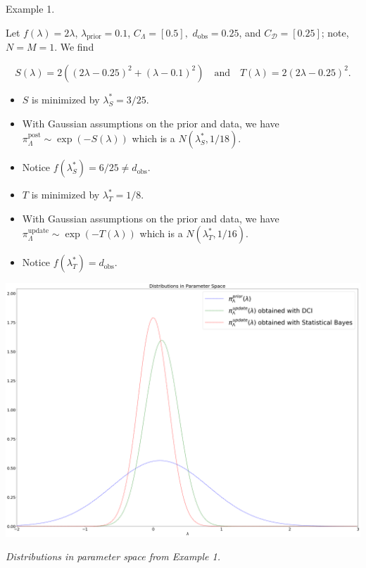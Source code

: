 \documentclass[11pt]{beamer}
\begin{document}
\begin{frame}

\begin{block}{Example 1.}

\noindent Let $f(\lambda)=2\lambda$, $\lambda_\text{prior}=0.1$, $C_\Lambda=[0.5],$ $d_\text{obs}=0.25$, and $C_\mathcal{D}=[0.25]$; note, $N=M=1$. We find

$$S(\lambda)=2((2\lambda-0.25)^2+(\lambda-0.1)^2) \quad \text{and} \quad T(\lambda)=2(2\lambda-0.25)^2.$$

\begin{itemize}

	\item $S$ is minimized by $\lambda^*_S=3/25$. 
	
	\item With Gaussian assumptions on the prior and data, we have $\pi_\Lambda^\text{post} \sim \exp(-S(\lambda))$ which is a $N(\lambda_S^*, 1/18)$. 
	
	\item Notice $f(\lambda^*_S)=6/25\neq d_\text{obs}$. 
	
 

	\item $T$ is minimized by $\lambda^*_T=1/8$. 
	
	\item With Gaussian assumptions on the prior and data, we have $\pi_\Lambda^\text{update} \sim \exp(-T(\lambda))$ which is a  $N(\lambda_T^*, 1/16)$.
	
	\item Notice $f(\lambda^*_T)=d_\text{obs}$. 

\end{itemize}
\end{block}


\end{frame}

\begin{frame}

\begin{center} 
\includegraphics[scale=0.15]{param}

\textit{Distributions in parameter space from Example 1.}
\end{center}

\end{frame}
\end{document}
